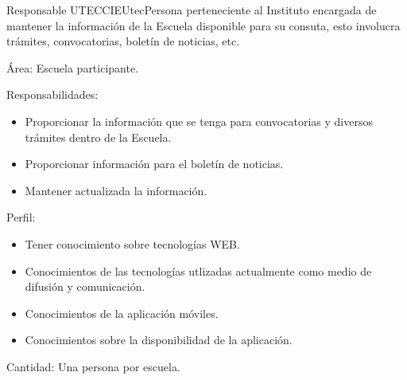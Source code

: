 \begin{actor}{Responsable UTEC}{CIEUtec}{Persona perteneciente al Instituto encargada de mantener la información de la Escuela disponible para su consuta, esto involucra trámites, convocatorias, boletín de noticias, etc.}
	
	\item[Área:] Escuela participante.
	\item[Responsabilidades:] \hspace{1pt}
	
	\begin{itemize}
		
		\item Proporcionar la información que se tenga para convocatorias y diversos trámites dentro de la Escuela.
		\item Proporcionar información para el boletín de noticias.
		\item Mantener actualizada la información.

		
	\end{itemize}
	
	\item[Perfil:] \hspace{1pt}
	
	\begin{itemize}
		
		\item Tener conocimiento sobre tecnologías WEB.
		\item Conocimientos de las tecnologías utlizadas actualmente como medio de difusión y comunicación.
		\item Conocimientos de la aplicación móviles.
		\item Conocimientos sobre la disponibilidad de la aplicación.	
	\end{itemize}
	
	\item[Cantidad:] Una persona por escuela.
	
\end{actor}

